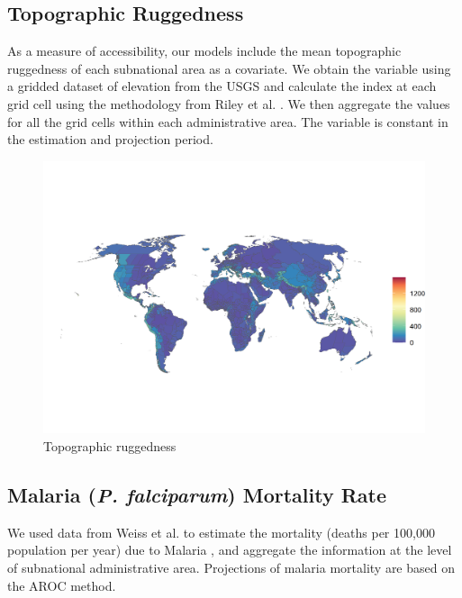 \documentclass{article}
\begin{document}
\pagebreak
\subsection{Topographic Ruggedness}
As a measure of accessibility, our models include the mean topographic ruggedness of each subnational area as a covariate. We obtain the variable using a gridded dataset of elevation from the USGS \citep{USGS1996} and calculate the index at each grid cell using the methodology from Riley et al. \citep{Riley1999}. We then aggregate the values for all the grid cells within each administrative area. The variable is constant in the estimation and projection period.

\begin{figure}[H]
  \centering
  \includegraphics[width=\linewidth]{img/covars/ruggedness.png}
  \caption{Topographic ruggedness}
\end{figure}

\pagebreak
\subsection{Malaria (\textit{P. falciparum}) Mortality Rate}
We used data from Weiss et al. to estimate the mortality (deaths per 100,000 population per year) due to Malaria \citep{Weiss2019}, and aggregate the information at the level of subnational administrative area. Projections of malaria mortality are based on the AROC method.
\end{document}
